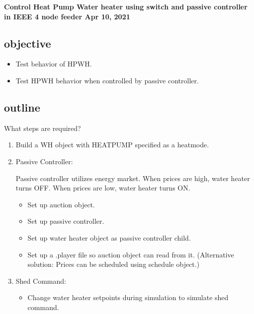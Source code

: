 \textbf{Control Heat Pump Water heater using switch and passive controller in IEEE 4 node feeder Apr 10, 2021}
\subsection{objective} 
    \begin{itemize}
        \item Test behavior of HPWH.
        \item Test HPWH behavior when controlled by passive controller.
    \end{itemize}

\subsection{outline}
    
    What steps are required?
    \begin{enumerate}
        \item Build a WH object with HEATPUMP specified as a heat\textunderscore mode.
        \item Passive Controller:\par
        Passive controller utilizes energy market. When prices are high, water heater turns OFF. When prices are low, water heater turns ON.
        \begin{itemize}
            \item Set up auction object.
            \item Set up passive controller.
            \item Set up water heater object as passive controller child.
            \item Set up a .player file so auction object can read from it. (Alternative solution: Prices can be scheduled using schedule object.)
        \end{itemize}
        \item Shed Command:
        \begin{itemize}
            \item Change water heater setpoints during simulation to simulate shed command.
        \end{itemize}
    \end{enumerate}
